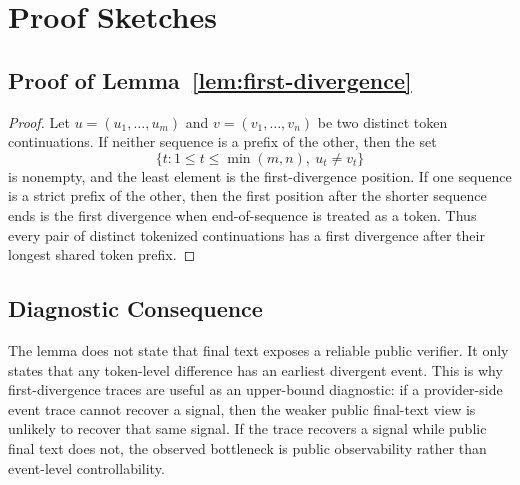 \section{Proof Sketches}
\label{app:proofs}

\subsection{Proof of Lemma~\ref{lem:first-divergence}}

\begin{proof}
Let $u=(u_1,\ldots,u_m)$ and $v=(v_1,\ldots,v_n)$ be two distinct token
continuations.  If neither sequence is a prefix of the other, then the set
\[
\{t : 1\le t\le \min(m,n),\ u_t\neq v_t\}
\]
is nonempty, and the least element is the first-divergence position.  If one
sequence is a strict prefix of the other, then the first position after the
shorter sequence ends is the first divergence when end-of-sequence is treated
as a token.  Thus every pair of distinct tokenized continuations has a first
divergence after their longest shared token prefix.
\end{proof}

\subsection{Diagnostic Consequence}

The lemma does not state that final text exposes a reliable public verifier.
It only states that any token-level difference has an earliest divergent
event.  This is why first-divergence traces are useful as an upper-bound
diagnostic: if a provider-side event trace cannot recover a signal, then the
weaker public final-text view is unlikely to recover that same signal.  If the
trace recovers a signal while public final text does not, the observed
bottleneck is public observability rather than event-level controllability.
